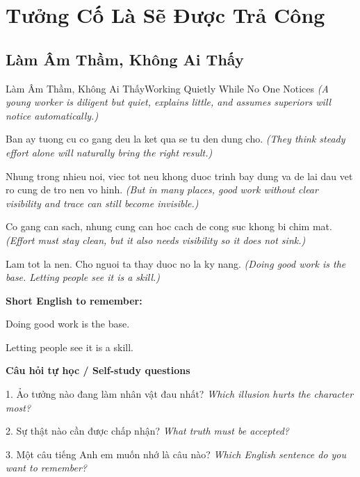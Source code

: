 \chapter{Tưởng Cố Là Sẽ Được Trả Công}

\section{Làm Âm Thầm, Không Ai Thấy}
\begin{truyen}{Làm Âm Thầm, Không Ai Thấy}{Working Quietly While No One Notices}
\textit{(A young worker is diligent but quiet, explains little, and assumes superiors will notice automatically.)}

Ban ay tuong cu co gang deu la ket qua se tu den dung cho.
\textit{(They think steady effort alone will naturally bring the right result.)}

Nhung trong nhieu noi, viec tot neu khong duoc trinh bay dung va de lai dau vet ro cung de tro nen vo hinh.
\textit{(But in many places, good work without clear visibility and trace can still become invisible.)}

Co gang can sach, nhung cung can hoc cach de cong suc khong bi chim mat.
\textit{(Effort must stay clean, but it also needs visibility so it does not sink.)}

\end{truyen}

\begin{baihoc}
Lam tot la nen. Cho nguoi ta thay duoc no la ky nang.
\textit{(Doing good work is the base. Letting people see it is a skill.)}
\end{baihoc}

\begin{ghinhoanh}
\textbf{Short English to remember:}

Doing good work is the base.

Letting people see it is a skill.

\end{ghinhoanh}

\begin{tuhocnhanh}
\textbf{Câu hỏi tự học / Self-study questions}

1. Ảo tưởng nào đang làm nhân vật đau nhất? \textit{Which illusion hurts the character most?}

2. Sự thật nào cần được chấp nhận? \textit{What truth must be accepted?}

3. Một câu tiếng Anh em muốn nhớ là câu nào? \textit{Which English sentence do you want to remember?}
\end{tuhocnhanh}
\ngancach

